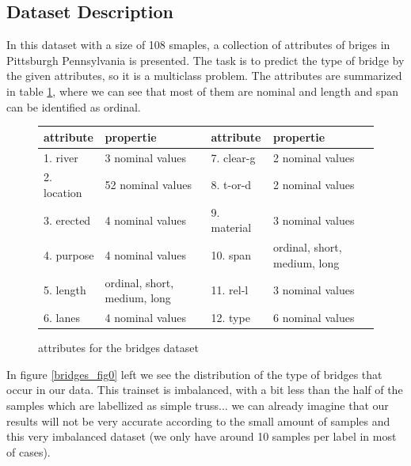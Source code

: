 \documentclass[11pt]{article}
\begin{document}
\subsection{Dataset Description}
In this dataset with a size of 108 smaples, a collection of attributes of briges in Pittsburgh Pennsylvania is presented. The task is to predict the type of bridge by the given attributes, so it is a multiclass problem. The attributes are summarized in table \ref{bridgetab_tab0}, where we can see that most of them are nominal and length and span can be identified as ordinal.
%
\begin{figure}
  \begin{tabular}{ | l | l | l | l |}
    \hline
    attribute & propertie                                    & attribute   & propertie                             \\ \hline
    1. river              & 3 nominal values                   & 7. clear-g           & 2 nominal values                      \\ \hline
    2. location   & 52 nominal values                  & 8. t-or-d    & 2 nominal values                      \\ \hline
    3. erected            & 4 nominal values                   & 9. material          & 3 nominal values                      \\ \hline
    4. purpose            & 4 nominal values                   & 10. span    & ordinal, short, medium, long                  \\ \hline
    5. length             & ordinal, short, medium, long & 11. rel-l       & 3 nominal values                     \\ \hline
    6. lanes             & 4 nominal values                                & 12. type               & 6 nominal values                       \\ \hline
  \end{tabular}
  \caption{attributes for the bridges dataset}
  \label{bridgetab_tab0}
\end{figure}
%
In figure \ref{bridges_fig0} left we see the distribution of the type of bridges that occur in our data.
This trainset is imbalanced, with a bit less than the half of the samples which are labellized as simple truss... we can already imagine that our results will not be very accurate according to the small amount of samples and this very imbalanced dataset (we only have around 10 samples per label in most of cases).
\end{document}
